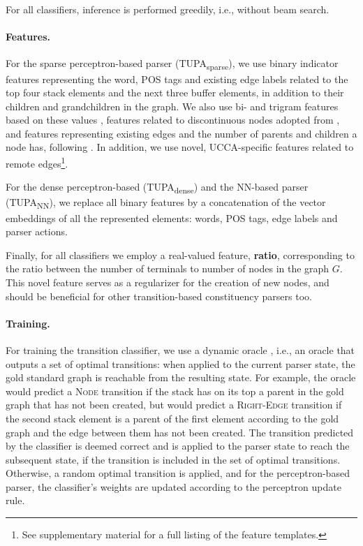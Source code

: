 \documentclass[11pt]{article}
\newcommand{\parser}[1]{TUPA\textsubscript{#1}}
\begin{document}
For all classifiers, inference is performed greedily, i.e., without beam search.

\paragraph{Features.}
For the sparse perceptron-based parser (\parser{sparse}),
we use binary indicator features representing
the word, POS tags and existing edge labels related to the top four stack elements and the next
three buffer elements, in addition to their children and grandchildren in the graph.
We also use bi- and trigram features based on these values \cite{zhang2009transition,zhu2013fast},
features related to discontinuous nodes adopted from \cite{maier2015discontinuous},
and features representing existing edges and the number of parents and children a node has, following \cite{tokgoz2015transition}.
In addition, we use novel, UCCA-specific features related to remote edges\footnote{See
supplementary material for a full listing of the feature templates.}.

For the dense perceptron-based (\parser{dense}) and the NN-based parser (\parser{NN}),
we replace all binary features by a
concatenation of the vector embeddings of all the represented elements:
words, POS tags, edge labels and parser actions.

Finally, for all classifiers we employ a real-valued feature,
\textbf{ratio}, corresponding to the ratio between the number of terminals to number of nodes
in the graph $G$.
This novel feature serves as a regularizer for the creation of new nodes,
and should be beneficial for other transition-based constituency parsers too.

\paragraph{Training.}
For training the transition classifier, we use a dynamic oracle \cite{goldberg2012dynamic},
i.e., an oracle that outputs a set of optimal transitions: when
applied to the current parser state, the gold
standard graph is reachable from the resulting state.
For example, the oracle would predict a \textsc{Node} transition if the stack 
has on its top a parent in the gold graph that has not been created,
but would predict a \textsc{Right-Edge} transition if the second stack
element is a parent of the
first element according to the gold graph and the edge between them has not been created.
The transition predicted by the classifier is deemed correct
and is applied to the parser state to reach the subsequent state,
if the transition is included in the set of optimal transitions.
Otherwise, a random optimal transition is applied,
and for the perceptron-based parser, the classifier's weights are updated according
to the perceptron update rule.
\end{document}
